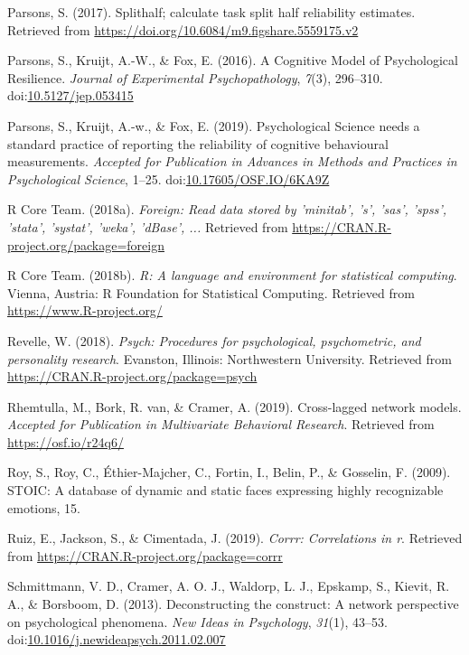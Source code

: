 \documentclass[man,floatsintext]{apa6}
\begin{document}
\leavevmode\hypertarget{ref-R-splithalf}{}%
Parsons, S. (2017). Splithalf; calculate task split half reliability estimates. Retrieved from \url{https://doi.org/10.6084/m9.figshare.5559175.v2}

\leavevmode\hypertarget{ref-Parsons2016}{}%
Parsons, S., Kruijt, A.-W., \& Fox, E. (2016). A Cognitive Model of Psychological Resilience. \emph{Journal of Experimental Psychopathology}, \emph{7}(3), 296--310. doi:\href{https://doi.org/10.5127/jep.053415}{10.5127/jep.053415}

\leavevmode\hypertarget{ref-Parsons2019}{}%
Parsons, S., Kruijt, A.-w., \& Fox, E. (2019). Psychological Science needs a standard practice of reporting the reliability of cognitive behavioural measurements. \emph{Accepted for Publication in Advances in Methods and Practices in Psychological Science}, 1--25. doi:\href{https://doi.org/10.17605/OSF.IO/6KA9Z}{10.17605/OSF.IO/6KA9Z}

\leavevmode\hypertarget{ref-R-foreign}{}%
R Core Team. (2018a). \emph{Foreign: Read data stored by 'minitab', 's', 'sas', 'spss', 'stata', 'systat', 'weka', 'dBase', ...} Retrieved from \url{https://CRAN.R-project.org/package=foreign}

\leavevmode\hypertarget{ref-R-base}{}%
R Core Team. (2018b). \emph{R: A language and environment for statistical computing}. Vienna, Austria: R Foundation for Statistical Computing. Retrieved from \url{https://www.R-project.org/}

\leavevmode\hypertarget{ref-R-psych}{}%
Revelle, W. (2018). \emph{Psych: Procedures for psychological, psychometric, and personality research}. Evanston, Illinois: Northwestern University. Retrieved from \url{https://CRAN.R-project.org/package=psych}

\leavevmode\hypertarget{ref-rhemtulla_cross-lagged_2019}{}%
Rhemtulla, M., Bork, R. van, \& Cramer, A. (2019). Cross-lagged network models. \emph{Accepted for Publication in Multivariate Behavioral Research}. Retrieved from \url{https://osf.io/r24q6/}

\leavevmode\hypertarget{ref-roy_stoic:_2009}{}%
Roy, S., Roy, C., Éthier-Majcher, C., Fortin, I., Belin, P., \& Gosselin, F. (2009). STOIC: A database of dynamic and static faces expressing highly recognizable emotions, 15.

\leavevmode\hypertarget{ref-R-corrr}{}%
Ruiz, E., Jackson, S., \& Cimentada, J. (2019). \emph{Corrr: Correlations in r}. Retrieved from \url{https://CRAN.R-project.org/package=corrr}

\leavevmode\hypertarget{ref-schmittmann_deconstructing_2013}{}%
Schmittmann, V. D., Cramer, A. O. J., Waldorp, L. J., Epskamp, S., Kievit, R. A., \& Borsboom, D. (2013). Deconstructing the construct: A network perspective on psychological phenomena. \emph{New Ideas in Psychology}, \emph{31}(1), 43--53. doi:\href{https://doi.org/10.1016/j.newideapsych.2011.02.007}{10.1016/j.newideapsych.2011.02.007}
\end{document}
